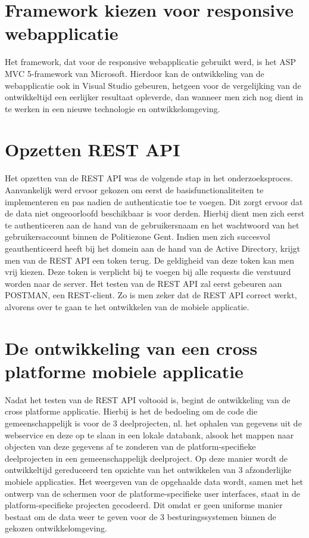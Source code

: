 \section{Framework kiezen voor responsive webapplicatie}
Het framework, dat voor de responsive webapplicatie gebruikt werd, is het ASP MVC 5-framework van Microsoft.
Hierdoor kan de ontwikkeling van de webapplicatie ook in Visual Studio gebeuren, hetgeen voor de vergelijking van de ontwikkeltijd
een eerlijker resultaat opleverde, dan wanneer men zich nog dient in te werken in een nieuwe technologie en ontwikkelomgeving.

\section{Opzetten REST API}
Het opzetten van de REST API was de volgende stap in het onderzoeksproces. Aanvankelijk werd ervoor gekozen om eerst de basisfunctionaliteiten te implementeren en
pas nadien de authenticatie toe te voegen. Dit zorgt ervoor dat de data niet ongeoorloofd beschikbaar is voor derden.
Hierbij dient men zich eerst te authenticeren aan de hand van de gebruikersnaam en het wachtwoord van het gebruikersaccount binnen de Politiezone Gent.
Indien men zich succesvol geauthenticeerd heeft bij het domein aan de hand van de Active Directory, krijgt men van de REST API een token terug. De geldigheid van deze token kan men vrij kiezen.
Deze token is verplicht bij te voegen bij alle requests die verstuurd worden naar de server.
Het testen van de REST API zal eerst gebeuren aan POSTMAN, een REST-client. Zo is men zeker dat de REST API correct werkt, alvorens over te gaan te het ontwikkelen van de mobiele applicatie.

\section{De ontwikkeling van een cross platforme mobiele applicatie}
Nadat het testen van de REST API voltooid is, begint de ontwikkeling van de cross platforme applicatie.
Hierbij is het de bedoeling om de code die gemeenschappelijk is voor de 3 deelprojecten,
nl. het ophalen van gegevens uit de webservice en deze op te slaan in een lokale databank, alsook het mappen naar objecten van deze gegevens
 af te zonderen van de platform-specifieke deelprojecten in een gemeenschappelijk deelproject.
 Op deze manier wordt de ontwikkeltijd gereduceerd ten opzichte van het ontwikkelen van 3 afzonderlijke mobiele applicaties.
Het weergeven van de opgehaalde data wordt, samen met het ontwerp van de schermen voor de platforme-specifieke user interfaces,
 staat in de platform-specifieke projecten gecodeerd. Dit omdat er geen uniforme manier bestaat om de data weer te geven voor de 3 besturingssystemen binnen
de gekozen ontwikkelomgeving.


